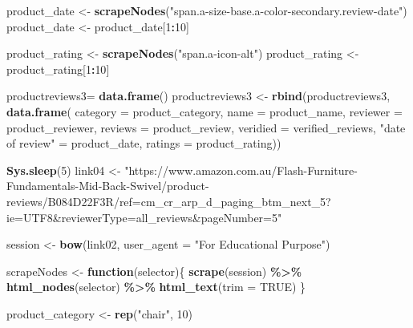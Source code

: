 \documentclass[
]{article}
\newenvironment{Shaded}{\begin{snugshade}}{\end{snugshade}}
\newcommand{\AttributeTok}[1]{\textcolor[rgb]{0.13,0.29,0.53}{#1}}
\newcommand{\ConstantTok}[1]{\textcolor[rgb]{0.56,0.35,0.01}{#1}}
\newcommand{\ControlFlowTok}[1]{\textcolor[rgb]{0.13,0.29,0.53}{\textbf{#1}}}
\newcommand{\DecValTok}[1]{\textcolor[rgb]{0.00,0.00,0.81}{#1}}
\newcommand{\FunctionTok}[1]{\textcolor[rgb]{0.13,0.29,0.53}{\textbf{#1}}}
\newcommand{\NormalTok}[1]{#1}
\newcommand{\OtherTok}[1]{\textcolor[rgb]{0.56,0.35,0.01}{#1}}
\newcommand{\SpecialCharTok}[1]{\textcolor[rgb]{0.81,0.36,0.00}{\textbf{#1}}}
\newcommand{\StringTok}[1]{\textcolor[rgb]{0.31,0.60,0.02}{#1}}
\begin{document}
\begin{Shaded}
\begin{Highlighting}[]
\NormalTok{  product\_date }\OtherTok{\textless{}{-}} \FunctionTok{scrapeNodes}\NormalTok{(}\StringTok{"span.a{-}size{-}base.a{-}color{-}secondary.review{-}date"}\NormalTok{)}
\NormalTok{  product\_date }\OtherTok{\textless{}{-}}\NormalTok{ product\_date[}\DecValTok{1}\SpecialCharTok{:}\DecValTok{10}\NormalTok{]}
  
\NormalTok{  product\_rating }\OtherTok{\textless{}{-}} \FunctionTok{scrapeNodes}\NormalTok{(}\StringTok{"span.a{-}icon{-}alt"}\NormalTok{)}
\NormalTok{  product\_rating }\OtherTok{\textless{}{-}}\NormalTok{ product\_rating[}\DecValTok{1}\SpecialCharTok{:}\DecValTok{10}\NormalTok{]}
  
\NormalTok{  productreviews3}\OtherTok{=} \FunctionTok{data.frame}\NormalTok{()}
\NormalTok{  productreviews3 }\OtherTok{\textless{}{-}} \FunctionTok{rbind}\NormalTok{(productreviews3, }\FunctionTok{data.frame}\NormalTok{(}
                      \AttributeTok{category =}\NormalTok{ product\_category,}
                      \AttributeTok{name =}\NormalTok{ product\_name,}
                      \AttributeTok{reviewer =}\NormalTok{ product\_reviewer,}
                      \AttributeTok{reviews =}\NormalTok{ product\_review,}
                      \AttributeTok{veridied =}\NormalTok{ verified\_reviews,}
                      \StringTok{"date of review"} \OtherTok{=}\NormalTok{ product\_date,}
                      \AttributeTok{ratings =}\NormalTok{ product\_rating))}
  
  \FunctionTok{Sys.sleep}\NormalTok{(}\DecValTok{5}\NormalTok{)}
\NormalTok{link04 }\OtherTok{\textless{}{-}} \StringTok{"https://www.amazon.com.au/Flash{-}Furniture{-}Fundamentals{-}Mid{-}Back{-}Swivel/product{-}reviews/B084D22F3R/ref=cm\_cr\_arp\_d\_paging\_btm\_next\_5?ie=UTF8\&reviewerType=all\_reviews\&pageNumber=5"}


\NormalTok{  session }\OtherTok{\textless{}{-}} \FunctionTok{bow}\NormalTok{(link02,}
               \AttributeTok{user\_agent =} \StringTok{"For Educational Purpose"}\NormalTok{)}

\NormalTok{  scrapeNodes }\OtherTok{\textless{}{-}} \ControlFlowTok{function}\NormalTok{(selector)\{}
    \FunctionTok{scrape}\NormalTok{(session) }\SpecialCharTok{\%\textgreater{}\%}
      \FunctionTok{html\_nodes}\NormalTok{(selector) }\SpecialCharTok{\%\textgreater{}\%}
      \FunctionTok{html\_text}\NormalTok{(}\AttributeTok{trim =} \ConstantTok{TRUE}\NormalTok{)}
\NormalTok{  \}}

\NormalTok{  product\_category }\OtherTok{\textless{}{-}} \FunctionTok{rep}\NormalTok{(}\StringTok{"chair"}\NormalTok{, }\DecValTok{10}\NormalTok{)}


\end{Highlighting}
\end{Shaded}
\end{document}
